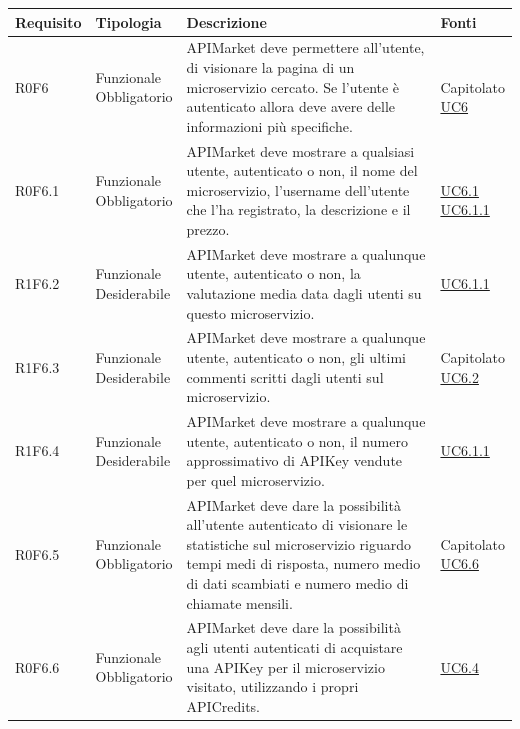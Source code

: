 \documentclass[12pt,a4paper,titlepage]{article}
\newcommand{\minitab}[2][1]{\begin{tabular}#1 #2\end{tabular}}
\newcommand{\uc}[1]{\hyperref[UC#1]{UC#1}}
\begin{document}
{\begin{longtable}{|m{5em}|m{6em}|m{28em}|m{5em}|}
			\hline
		\end{longtable}
		\begin{longtable}{|m{5em}|m{6em}|m{28em}|m{5em}|}
			\hline
			\textbf{Requisito} & \textbf{Tipologia}  & \textbf{Descrizione} & \textbf{Fonti} \\
			\hline
			R0F6 & \minitab[c]{Funzionale\\Obbligatorio} & APIMarket deve permettere all'utente, di visionare la pagina di un microservizio cercato. Se l'utente è autenticato allora deve avere delle informazioni più specifiche. & \shortstack[l]{\\Capitolato\\\uc{6}}\\
			\hline
			R0F6.1 & \minitab[c]{Funzionale\\Obbligatorio} & APIMarket deve mostrare a qualsiasi utente, autenticato o non, il nome del microservizio, l'username dell'utente che l'ha registrato, la descrizione e il prezzo. & \shortstack[l]{\\\uc{6.1}\\\uc{6.1.1}}\\
			\hline
			R1F6.2 & \minitab[c]{Funzionale\\Desiderabile} &APIMarket deve mostrare a qualunque utente, autenticato o non, la valutazione media data dagli utenti su questo microservizio. & \uc{6.1.1}\\
			\hline
			R1F6.3 & \minitab[c]{Funzionale\\Desiderabile} & APIMarket deve mostrare  a qualunque utente, autenticato o non, gli ultimi commenti scritti dagli utenti sul microservizio. & \shortstack[l]{Capitolato\\\uc{6.2}}\\
			\hline
			R1F6.4 & \minitab[c]{Funzionale\\Desiderabile} & APIMarket deve mostrare  a qualunque utente, autenticato o non, il numero approssimativo di APIKey vendute per quel microservizio. & \uc{6.1.1}\\
			\hline
			R0F6.5 & \minitab[c]{Funzionale\\Obbligatorio} & APIMarket deve dare la possibilità all'utente autenticato di visionare le statistiche sul microservizio riguardo tempi medi di risposta, numero medio di dati scambiati e numero medio di chiamate mensili. & \shortstack[l]{Capitolato\\\uc{6.6}}\\
			\hline
			R0F6.6 & \minitab[c]{Funzionale\\Obbligatorio} & APIMarket deve dare la possibilità agli utenti autenticati di acquistare una APIKey per il microservizio visitato, utilizzando i propri APICredits. & \uc{6.4}\\

\end{longtable}}
\end{document}

